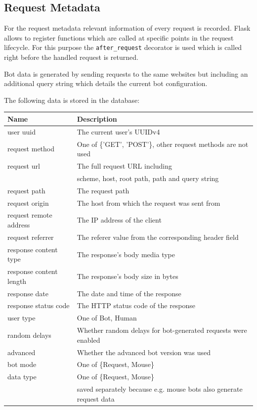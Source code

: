 \documentclass[
    fontsize=12pt,
    headings=small,
    parskip=half,           %
    bibliography=totoc,
    numbers=noenddot,       %
    open=any,               %
    final,                   %
    table
]{scrreprt}
\renewcommand{\arraystretch}{1.2}
\begin{document}
\subsection{Request Metadata}

For the request metadata relevant information of every request is recorded. Flask allows to register functions which are called at specific points in the request lifecycle. For this purpose the \lstinline{after_request} decorator is used which is called right before the handled request is returned.

Bot data is generated by sending requests to the same websites but including an additional query string which details the current bot configuration.

The following data is stored in the database:

\renewcommand{\arraystretch}{1.2}

\begin{table}[H]
\begin{center}
\begin{tabular}{ll}
\toprule
Name & Description \\
\midrule
user uuid & The current user's UUIDv4 \\
request method & One of \{'GET', 'POST'\}, other request methods are not used \\
request url & The full request URL including \\ & scheme, host, root path, path and query string \\
request path & The request path \\
request origin & The host from which the request was sent from \\
request remote address & The IP address of the client \\
request referrer & The referer value from the corresponding header field \\
response content type & The response's body media type \\
response content length & The response's body size in bytes \\
response date & The date and time of the response \\
response status code & The HTTP status code of the response \\
user type & One of {Bot, Human} \\
random delays & Whether random delays for bot-generated requests were enabled \\
advanced & Whether the advanced bot version was used \\
bot mode & One of \{Request, Mouse\} \\
data type & One of \{Request, Mouse\} \\ & saved separately because e.g. mouse bots also generate request data \\
\bottomrule

\end{tabular}
\end{center}
\end{table}
\end{document}
